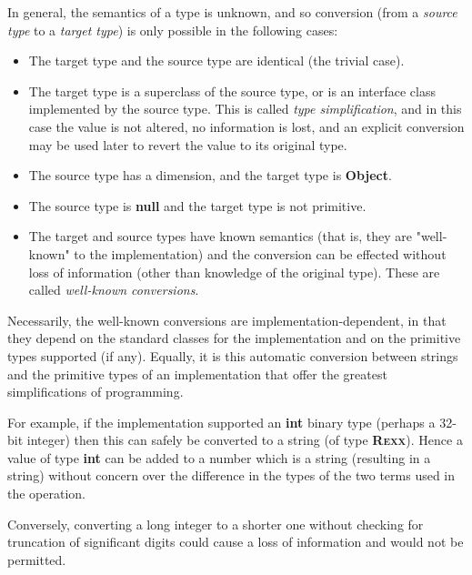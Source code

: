 In general, the semantics of a type is unknown, and so conversion (from
a \emph{source type} to a \emph{target type}) is only possible in
the following cases:
\begin{itemize}
\item The target type and the source type are identical (the trivial
case).
\item 
The target type is a superclass of the source type, or is an
interface class implemented by the source type.
This is called \emph{type simplification}, and in this case the value
is not altered, no information is lost, and an explicit conversion may
be used later to revert the value to its original type.
\item 
The source type has a dimension, and the target type
is \textbf{Object}.
\item 
The source type is \textbf{null} and the target type is not primitive.
\item 
{}
The target and source types have known semantics (that is, they are
"well-known" to the implementation) and the conversion can be
effected without loss of information (other than knowledge of the
original type).
These are called \emph{well-known conversions}.
\end{itemize}
 
Necessarily, the well-known conversions are implementation-dependent, in
that they depend on the standard classes for the implementation and on
the primitive types supported (if any).
Equally, it is this automatic conversion between strings and the
primitive types of an implementation that offer the greatest
simplifications of \nr{} programming.
 
For example, if the implementation supported an \textbf{int}
binary type (perhaps a 32-bit integer) then this can safely be
converted to a \nr{} string (of type \textbf{R\textsc{exx}}).
Hence a value of type \textbf{int} can be added to a number which is a
\nr{} string (resulting in a \nr{} string) without concern over the
difference in the types of the two terms used in the operation.
 
Conversely, converting a long integer to a shorter one without checking
for truncation of significant digits could cause a loss of information
and would not be permitted.
 

